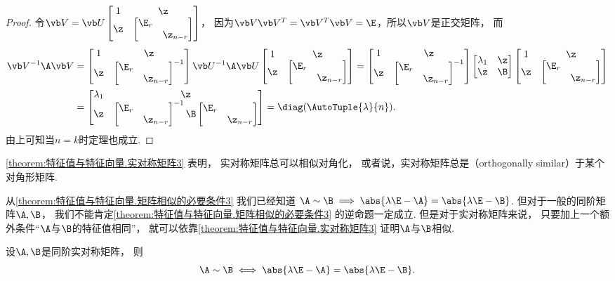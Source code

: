 \begin{theorem}
\begin{proof}
令\(\Q=\P\begin{bmatrix} 1 & \z \\ \z & \M \end{bmatrix}\)，
因为\(\Q\Q^T=\Q^T\Q=\E\)，所以\(\Q\)是正交矩阵，
而\begin{align*}
	\Q^{-1}\A\Q
	&=\begin{bmatrix}
		1 & \z \\
		\z & \M^{-1}
	\end{bmatrix}\P^{-1}\A\P\begin{bmatrix}
		1 & \z \\
		\z & \M
	\end{bmatrix}=\begin{bmatrix}
		1 & \z \\
		\z & \M^{-1}
	\end{bmatrix}\begin{bmatrix}
		\lambda_1 & \z \\
		\z & \B
	\end{bmatrix}\begin{bmatrix}
		1 & \z \\
		\z & \M
	\end{bmatrix} \\
	&=\begin{bmatrix}
		\lambda_1 & \z \\
		\z & \M^{-1}\B\M
	\end{bmatrix}
	=\diag(\AutoTuple{\lambda}{n}).
\end{align*}
由上可知当\(n=k\)时定理也成立.
\end{proof}
\end{theorem}

\cref{theorem:特征值与特征向量.实对称矩阵3} 表明，
实对称矩阵总可以相似对角化，
或者说，实对称矩阵总是（{orthogonally similar}）于某个对角形矩阵.

从\cref{theorem:特征值与特征向量.矩阵相似的必要条件3} 我们已经知道
\(\A\sim\B \implies \abs{\lambda\E-\A}=\abs{\lambda\E-\B}\).
但对于一般的同阶矩阵\(\A,\B\)，
我们不能肯定\cref{theorem:特征值与特征向量.矩阵相似的必要条件3} 的逆命题一定成立.
但是对于实对称矩阵来说，
只要加上一个额外条件“\(\A\)与\(\B\)的特征值相同”，
就可以依靠\cref{theorem:特征值与特征向量.实对称矩阵3} 证明\(\A\)与\(\B\)相似.
\begin{corollary}
设\(\A,\B\)是同阶实对称矩阵，
则\[
	\A\sim\B
	\iff
	\abs{\lambda\E-\A}=\abs{\lambda\E-\B}.
\]
\end{corollary}

